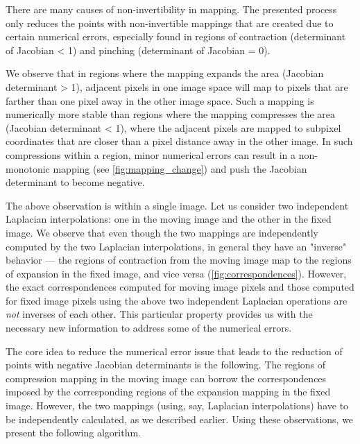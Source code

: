 \documentclass[lettersize,journal]{IEEEtran}
\begin{document}
There are many causes of non-invertibility in mapping. The presented process only reduces the points with non-invertible mappings that are created due to certain numerical errors, especially found in regions of contraction (determinant of Jacobian < 1) and pinching (determinant of Jacobian = 0).



 We observe that in regions where the mapping expands the area (Jacobian determinant > 1), adjacent pixels in one image space will map to pixels that are farther than one pixel away in the other image space. Such a mapping is numerically more stable than regions where the mapping compresses the area (Jacobian determinant < 1), where the adjacent pixels are mapped to subpixel coordinates that are closer than a pixel distance away in the other image. In such compressions within a region, minor numerical errors can result in a non-monotonic mapping (see \autoref{fig:mapping_change}) and push the Jacobian determinant to become negative. 

The above observation is within a single image. Let us consider two independent Laplacian interpolations: one in the moving image and the other in the fixed image. We observe that even though the two mappings are independently computed by the two Laplacian interpolations, in general they have an "inverse" behavior — the regions of contraction from the moving image map to the regions of expansion in the fixed image, and vice versa (\autoref{fig:correspondences}). However, the exact correspondences computed for moving image pixels and those computed for fixed image pixels using the above two independent Laplacian operations are {\em not} inverses of each other. This particular property provides us with the necessary new information to address some of the numerical errors. 

The core idea to reduce the numerical error issue that leads to the reduction of points with negative Jacobian determinants is the following. The regions of compression mapping in the moving image can borrow the correspondences imposed by the corresponding regions of the expansion mapping in the fixed image. However, the two mappings (using, say, Laplacian interpolations) have to be independently calculated, as we described earlier. Using these observations, we present the following algorithm.

\end{document}

